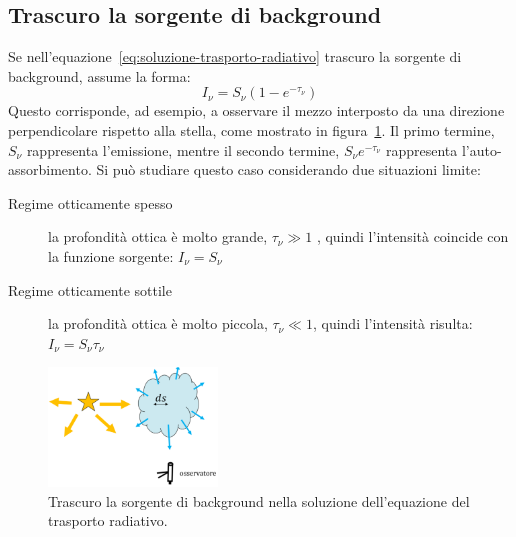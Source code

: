 \subsection{Trascuro la sorgente di background}\label{sec:trascuro-sorgente-trasporto-radiativo}
Se nell'equazione~\eqref{eq:soluzione-trasporto-radiativo} trascuro la sorgente di background, assume la forma:
\begin{equation}\label{eq:soluzione-no-sorgente-trasporto-radiativo}
    I_\nu = S_\nu (1- e^{-\tau_\nu})
\end{equation}
Questo corrisponde, ad esempio, a osservare il mezzo interposto da una direzione perpendicolare rispetto alla stella, come mostrato in figura~\ref{fig:trasporto-radiativo-perpendicolare}. Il primo termine, $S_\nu$ rappresenta l'emissione, mentre il secondo termine, $S_\nu e^{-\tau_\nu}$ rappresenta l'auto-assorbimento. Si può studiare questo caso considerando due situazioni limite:
\begin{description}
    \item[Regime otticamente spesso] la profondità ottica è molto grande, $\tau_\nu \gg 1$ , quindi l'intensità coincide con la funzione sorgente: $I_\nu = S_\nu$
    \item[Regime otticamente sottile] la profondità ottica è molto piccola, $\tau_\nu \ll 1$, quindi l'intensità risulta: $I_\nu = S_\nu \tau_\nu$
\end{description}

\begin{figure}
\centering
\includegraphics[width=0.4\textwidth]{immagini/trasporto-radiativo-perpendicolare.png}
\caption{Trascuro la sorgente di background nella soluzione dell'equazione del trasporto radiativo.}
\label{fig:trasporto-radiativo-perpendicolare}
\end{figure}

